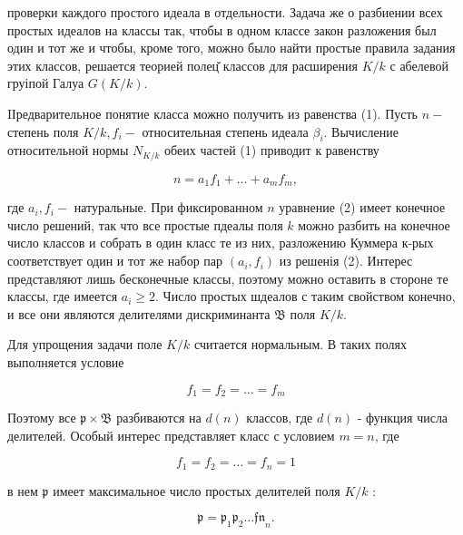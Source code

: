 \documentclass[10pt]{article}
\begin{document}
проверки каждого простого идеала в отдельности. Задача же о разбиении всех простых идеалов на классы так, чтобы в одном классе закон разложения был один и тот же и чтобы, кроме того, можно было найти простые правила задания этих классов, решается теорией полец̆ классов для расширения $K / k$ с абелевой груіпой Галуа $G(K / k)$.



IІредварительное понятие класса можно получить из равенства (1). Пусть $n-$ степень поля $K / k, f_{i}-$ относительная степень идеала $\beta_{i}$. Вычисление относительной нормы $N_{K / k}$ обеих частей (1) приводит к равенству



\[

n=a_{1} f_{1}+\ldots+a_{m} f_{m},

\]



где $a_{i}, f_{i}-$ натуральные. При фиксированном $n$ уравнение (2) имеет конечное число решений, так что все простые пдеалы поля $k$ можно разбить на конечное число классов и собрать в один класс те из них, разложению Куммера к-рых соответствует один и тот же набор пар $\left(a_{i}, f_{i}\right)$ из решенія (2). Интерес представляют лишь бесконечные классы, поэтому можно оставить в стороне те классы, где имеется $a_{i} \geqslant 2$. Число простых шдеалов с таким свойством конечно, и все они являются делителями дискриминанта $\mathfrak{B}$ поля $K / k$.



Для упрощения задачи поле $K / k$ считается нормальным. В таких полях выполняется условие



\[

f_{1}=f_{2}=\ldots=f_{m}

\]



Поэтому все $\mathfrak{p} \times \mathfrak{B}$ разбиваются на $d(n)$ классов, где $d(n)$ - функция числа делителей. Особый интерес представляет класс с условием $m=n$, где



\[

f_{1}=f_{2}=\ldots=f_{n}=1

\]



в нем $\mathfrak{p}$ имеет максимальное число простых делителей поля $K / k$ :



\[

\mathfrak{p}=\mathfrak{p}_{1} \mathfrak{p}_{2} \ldots \mathfrak{f n}_{n} .

\]
\end{document}
